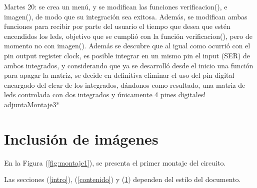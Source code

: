 \documentclass{article}
\begin{document}
Martes 20: se crea un menú, y se modifican las funciones verificacion(), e imagen(),  de modo que su integración sea exitosa. Además, se modifican ambas funciones para recibir por parte del usuario el tiempo que desea que estén encendidos los leds, objetivo que se cumplió con la función verificacion(), pero de momento no con imagen(). Además se descubre que al igual como ocurrió con el pin output register clock, es posible integrar en un mismo pin el input (SER) de ambos integrados, y considerando que ya se desarrolló desde el inicio una función para apagar la matriz, se decide en definitiva eliminar el uso del pin digital encargado del clear de los integrados, dándonos como resultado, una matriz de leds controlada con  dos integrados y únicamente 4 pines digitales! adjuntaMontaje3*
\section{Inclusión de imágenes} \label{imagenes}

En la Figura (\ref{fig:montaje1}), se presenta el primer montaje del circuito. 

Las secciones (\ref{intro}), (\ref{contenido}) y (\ref{imagenes}) dependen del estilo del documento.



\end{document}
